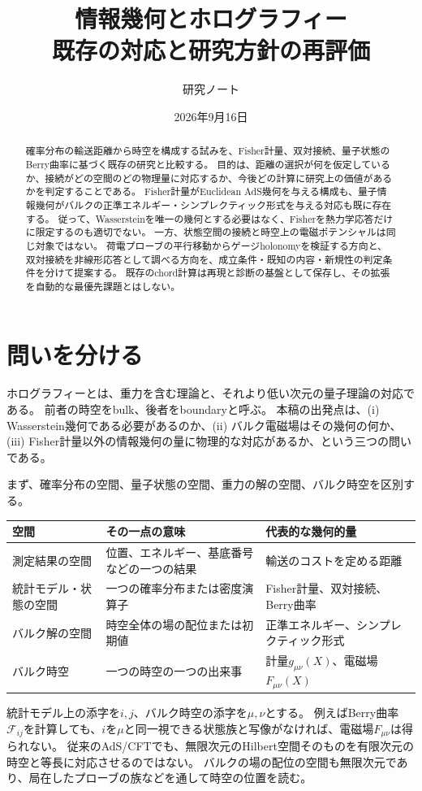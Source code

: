 \documentclass[a4paper,11pt]{ltjsarticle}
\title{情報幾何とホログラフィー\\既存の対応と研究方針の再評価}
\author{研究ノート}
\date{2026年9月16日}
\numberwithin{equation}{section}
\begin{document}
\maketitle
\begin{abstract}
確率分布の輸送距離から時空を構成する試みを、Fisher計量、双対接続、量子状態のBerry曲率に基づく既存の研究と比較する。
目的は、距離の選択が何を仮定しているか、接続がどの空間のどの物理量に対応するか、今後どの計算に研究上の価値があるかを判定することである。
Fisher計量がEuclidean AdS幾何を与える構成も、量子情報幾何がバルクの正準エネルギー・シンプレクティック形式を与える対応も既に存在する。
従って、Wassersteinを唯一の幾何とする必要はなく、Fisherを熱力学応答だけに限定するのも適切でない。
一方、状態空間の接続と時空上の電磁ポテンシャルは同じ対象ではない。
荷電プローブの平行移動からゲージholonomyを検証する方向と、双対接続を非線形応答として調べる方向を、成立条件・既知の内容・新規性の判定条件を分けて提案する。
既存のchord計算は再現と診断の基盤として保存し、その拡張を自動的な最優先課題とはしない。
\end{abstract}
\setcounter{tocdepth}{1}
\tableofcontents
\clearpage

\section{問いを分ける}
ホログラフィーとは、重力を含む理論と、それより低い次元の量子理論の対応である。
前者の時空をbulk、後者をboundaryと呼ぶ。
本稿の出発点は、(i) Wasserstein幾何である必要があるのか、(ii) バルク電磁場はその幾何の何か、
(iii) Fisher計量以外の情報幾何の量に物理的な対応があるか、という三つの問いである。

まず、確率分布の空間、量子状態の空間、重力の解の空間、バルク時空を区別する。
\begin{center}\small
\begin{tabular}{p{}p{}p{}}\toprule
空間 & その一点の意味 & 代表的な幾何的量\\\midrule
測定結果の空間 & 位置、エネルギー、基底番号などの一つの結果 & 輸送のコストを定める距離\\
統計モデル・状態の空間 & 一つの確率分布または密度演算子 & Fisher計量、双対接続、Berry曲率\\
バルク解の空間 & 時空全体の場の配位または初期値 & 正準エネルギー、シンプレクティック形式\\
バルク時空 & 一つの時空の一つの出来事 & 計量$g_{\mu\nu}(X)$、電磁場$F_{\mu\nu}(X)$\\\bottomrule
\end{tabular}\end{center}
統計モデル上の添字を$i,j$、バルク時空の添字を$\mu,\nu$とする。
例えばBerry曲率$\mathcal F_{ij}$を計算しても、$i$を$\mu$と同一視できる状態族と写像がなければ、電磁場$F_{\mu\nu}$は得られない。
従来のAdS/CFTでも、無限次元のHilbert空間そのものを有限次元の時空と等長に対応させるのではない。
バルクの場の配位の空間も無限次元であり、局在したプローブの族などを通して時空の位置を読む。
\end{document}
